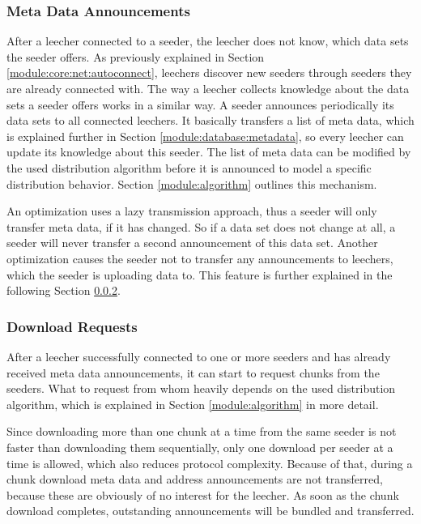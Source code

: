 \subsubsection{Meta Data Announcements}
After a leecher connected to a seeder, the leecher does not know, which data sets the seeder offers. As previously explained in Section \ref{module:core:net:autoconnect}, leechers discover new seeders through seeders they are already connected with. The way a leecher collects knowledge about the data sets a seeder offers works in a similar way. A seeder announces periodically its data sets to all connected leechers. It basically transfers a list of meta data, which is explained further in Section \ref{module:database:metadata}, so every leecher can update its knowledge about this seeder. The list of meta data can be modified by the used distribution algorithm before it is announced to model a specific distribution behavior. Section \ref{module:algorithm} outlines this mechanism.

An optimization uses a lazy transmission approach, thus a seeder will only transfer meta data, if it has changed. So if a data set does not change at all, a seeder will never transfer a second announcement of this data set. Another optimization causes the seeder not to transfer any announcements to leechers, which the seeder is uploading data to. This feature is further explained in the following Section \ref{module:core:net:downloadreq}.


\subsubsection{Download Requests}
\label{module:core:net:downloadreq}
After a leecher successfully connected to one or more seeders and has already received meta data announcements, it can start to request chunks from the seeders. What to request from whom heavily depends on the used distribution algorithm, which is explained in Section \ref{module:algorithm} in more detail. 

Since downloading more than one chunk at a time from the same seeder is not faster than downloading them sequentially, only one download per seeder at a time is allowed, which also reduces protocol complexity. Because of that, during a chunk download meta data and address announcements are not transferred, because these are obviously of no interest for the leecher. As soon as the chunk download completes, outstanding announcements will be bundled and transferred.

